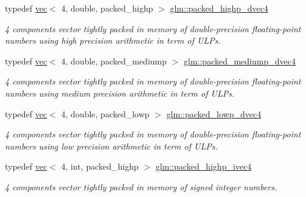 \begin{DoxyCompactItemize}
typedef \hyperlink{structglm_1_1vec}{vec}$<$ 4, double, packed\+\_\+highp $>$ \hyperlink{group__gtc__type__aligned_ga7eb6a2440202876a3a223a1931dd496a}{glm\+::packed\+\_\+highp\+\_\+dvec4}
\begin{DoxyCompactList}\small\item\em 4 components vector tightly packed in memory of double-\/precision floating-\/point numbers using high precision arithmetic in term of U\+L\+Ps. \end{DoxyCompactList}\item 
\mbox{\label{group__gtc__type__aligned_gaa88ce743e1248a4e822e591e6bdf071b}} 
typedef \hyperlink{structglm_1_1vec}{vec}$<$ 4, double, packed\+\_\+mediump $>$ \hyperlink{group__gtc__type__aligned_gaa88ce743e1248a4e822e591e6bdf071b}{glm\+::packed\+\_\+mediump\+\_\+dvec4}
\begin{DoxyCompactList}\small\item\em 4 components vector tightly packed in memory of double-\/precision floating-\/point numbers using medium precision arithmetic in term of U\+L\+Ps. \end{DoxyCompactList}\item 
\mbox{\label{group__gtc__type__aligned_ga54190c1986b9a3653bf49fddd81e753b}} 
typedef \hyperlink{structglm_1_1vec}{vec}$<$ 4, double, packed\+\_\+lowp $>$ \hyperlink{group__gtc__type__aligned_ga54190c1986b9a3653bf49fddd81e753b}{glm\+::packed\+\_\+lowp\+\_\+dvec4}
\begin{DoxyCompactList}\small\item\em 4 components vector tightly packed in memory of double-\/precision floating-\/point numbers using low precision arithmetic in term of U\+L\+Ps. \end{DoxyCompactList}\item 
\mbox{\label{group__gtc__type__aligned_gabf988b7dc66612bc1d4c9ce44d5b5642}} 
typedef \hyperlink{structglm_1_1vec}{vec}$<$ 4, int, packed\+\_\+highp $>$ \hyperlink{group__gtc__type__aligned_gabf988b7dc66612bc1d4c9ce44d5b5642}{glm\+::packed\+\_\+highp\+\_\+ivec4}
\begin{DoxyCompactList}\small\item\em 4 components vector tightly packed in memory of signed integer numbers. \end{DoxyCompactList}\item 

\end{DoxyCompactItemize}
